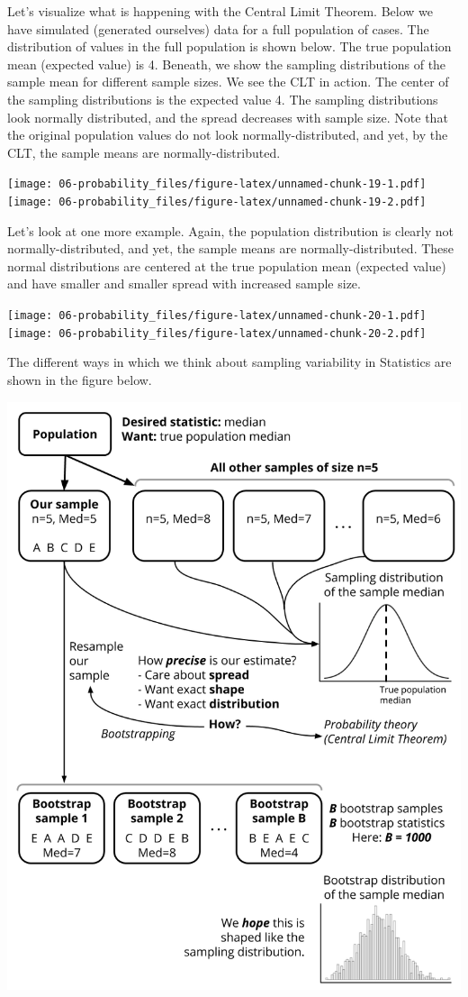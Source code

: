 \documentclass[
]{book}
\begin{document}
Let's visualize what is happening with the Central Limit Theorem. Below we have simulated (generated ourselves) data for a full population of cases. The distribution of values in the full population is shown below. The true population mean (expected value) is 4. Beneath, we show the sampling distributions of the sample mean for different sample sizes. We see the CLT in action. The center of the sampling distributions is the expected value 4. The sampling distributions look normally distributed, and the spread decreases with sample size. Note that the original population values do not look normally-distributed, and yet, by the CLT, the sample means are normally-distributed.

\texttt{[image: 06-probability\_files/figure-latex/unnamed-chunk-19-1.pdf]} \texttt{[image: 06-probability\_files/figure-latex/unnamed-chunk-19-2.pdf]}

Let's look at one more example. Again, the population distribution is clearly not normally-distributed, and yet, the sample means are normally-distributed. These normal distributions are centered at the true population mean (expected value) and have smaller and smaller spread with increased sample size.

\texttt{[image: 06-probability\_files/figure-latex/unnamed-chunk-20-1.pdf]} \texttt{[image: 06-probability\_files/figure-latex/unnamed-chunk-20-2.pdf]}

The different ways in which we think about sampling variability in Statistics are shown in the figure below.

\includegraphics{Photos/sampling_variation_flowchart.png}
\end{document}
